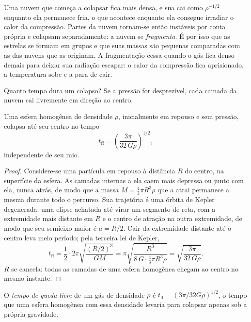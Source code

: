 Uma nuvem que começa a colapsar fica mais densa, e sua  cai como
$\rho^{-1/2}$ enquanto ela permanece fria, o que acontece enquanto ela consegue irradiar o
calor da compressão. Partes da nuvem tornam-se então instáveis por conta própria
e colapsam separadamente: a nuvem se \emph{fragmenta}. É por isso que as estrelas se formam
em grupos e que suas massas são pequenas comparadas com as das nuvens que as
originam. A fragmentação cessa quando o gás fica denso demais para deixar sua radiação
escapar: o calor da compressão fica aprisionado, a temperatura sobe e a
 para de cair.

Quanto tempo dura um colapso? Se a pressão for desprezível, cada camada da
nuvem cai livremente em direção ao centro.

\begin{proposition}\label{prop:b2:ism-star-formation:free-fall}
Uma esfera homogênea de densidade $\rho$, inicialmente em repouso e sem pressão,
colapsa até seu centro no tempo
\[
  t_{\mathrm{ff}} = \left(\frac{3\pi}{32\,G\rho}\right)^{1/2},
\]
independente de seu raio.
\end{proposition}

\begin{proof}
Considere-se uma partícula em repouso à distância $R$ do centro, na
superfície da esfera. As camadas internas a ela caem mais depressa ou junto com ela, nunca
atrás, de modo que a massa $M = \tfrac43\pi R^3\rho$ que a atrai permanece a mesma
durante todo o percurso. Sua trajetória é uma órbita de Kepler degenerada: uma elipse achatada até virar
um segmento de reta, com a extremidade mais distante em $R$ e o centro de atração na
outra extremidade, de modo que seu semieixo maior é $a = R/2$. Cair da extremidade distante
até o centro leva meio período; pela terceira lei de Kepler,
\[
  t_{\mathrm{ff}} = \frac12\cdot 2\pi\sqrt{\frac{(R/2)^3}{GM}}
  = \pi\sqrt{\frac{R^3}{8\,G\cdot\frac43\pi R^3\rho}}
  = \sqrt{\frac{3\pi}{32\,G\rho}} .
\]
$R$ se cancela: todas as camadas de uma esfera homogênea chegam ao centro no mesmo
instante.
\end{proof}

\begin{definition}\label{def:b2:ism-star-formation:free-fall}
O \emph{tempo de queda livre} de um gás de densidade $\rho$ é
$t_{\mathrm{ff}} = (3\pi/32G\rho)^{1/2}$, o tempo que uma esfera homogênea com essa
densidade levaria para colapsar apenas sob a própria gravidade.
\end{definition}

